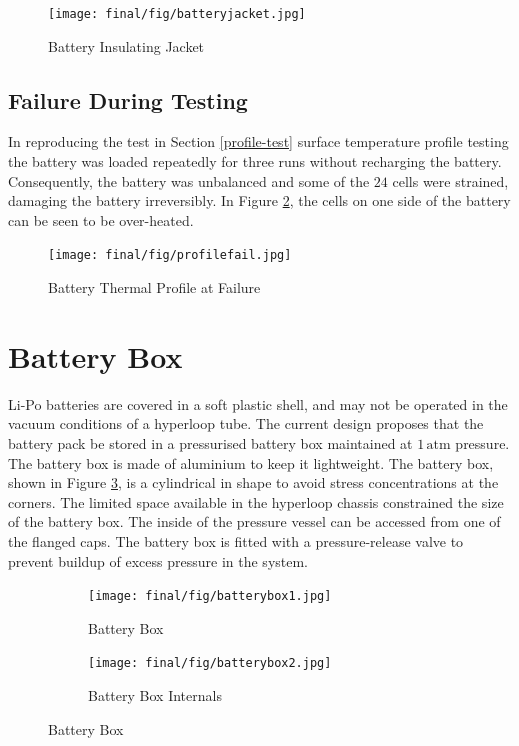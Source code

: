 \documentclass[11pt]{article}
\numberwithin{equation}{subsection} %
\newcommand{\unit}[1]{\ensuremath{\, \mathrm{#1}}}             %
\begin{document}
\begin{figure}[h!]
 \centering
	\texttt{[image: final/fig/batteryjacket.jpg]}
    \caption{Battery Insulating Jacket}
    \label{fig:batteryjacket}
\end{figure}

\pagebreak

\subsection{Failure During Testing}
In reproducing the test in Section \ref{profile-test} surface temperature profile testing the battery was loaded repeatedly for three runs without recharging the battery. Consequently, the battery was unbalanced and some of the $24$ cells were strained, damaging the battery irreversibly. In Figure \ref{fig:Battery Thermal Profile Failure}, the cells on one side of the battery can be seen to be over-heated.

\begin{figure}[h!]
 \centering
	\texttt{[image: final/fig/profilefail.jpg]}
    \caption{Battery Thermal Profile at Failure}
    \label{fig:Battery Thermal Profile Failure}
\end{figure}


\section{Battery Box}
Li-Po batteries are covered in a soft plastic shell, and may not be operated in the vacuum conditions of a hyperloop tube. The current design proposes that the battery pack be stored in a pressurised battery box maintained at $1\unit{atm}$ pressure. The battery box is made of aluminium to keep it lightweight. The battery box, shown in Figure \ref{fig:Battery Box}, is a cylindrical in shape to avoid stress concentrations at the corners. The limited space available in the hyperloop chassis constrained the size of the battery box. The inside of the pressure vessel can be accessed from one of the flanged caps. The battery box is fitted with a pressure-release valve to prevent buildup of excess pressure in the system.

\begin{figure}[!htb]
     \centering
     \begin{subfigure}[b]{0.49\textwidth}
         \centering
	    \texttt{[image: final/fig/batterybox1.jpg]}
        \caption{Battery Box}
        \label{fig:Battery Box}
     \end{subfigure}
     \hfill
     \begin{subfigure}[b]{0.49\textwidth}
         \centering
	    \texttt{[image: final/fig/batterybox2.jpg]}
        \caption{Battery Box Internals}
        \label{fig:internals}
     \end{subfigure}
     \caption{Battery Box}
\end{figure}
\end{document}
